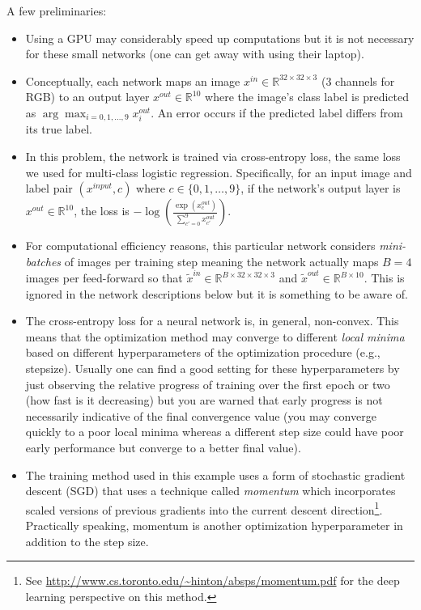 \documentclass{article}
\newcommand{\field}[1]{\mathbb{#1}}
\newcommand{\1}{\mathbf{1}}
\newcommand{\R}{\field{R}} %
\begin{document}
A few preliminaries:
\begin{itemize}
  \item Using a GPU may considerably speed up computations but it is not necessary for these small networks (one can get away with using their laptop).
  \item Conceptually, each network maps an image $x^{in} \in \R^{32 \times 32 \times 3}$ (3 channels for RGB) to an output layer $x^{out} \in \R^{10}$ where the image's class label is predicted as $\arg\max_{i=0,1,\dots,9} x_{i}^{out}$. An error occurs if the predicted label differs from its true label. 
  \item In this problem, the network is trained via cross-entropy loss, the same loss we used for multi-class logistic regression. Specifically, for an input image and label pair $(x^{input}, c)$ where $c \in \{0,1,\dots,9\}$, if the network's output layer is $x^{out} \in \R^{10}$, the loss is $-\log( \frac{\exp(x_c^{out})}{\sum_{c'=0}^9 x_{c'}^{out}})$.
  \item For computational efficiency reasons, this particular network considers \emph{mini-batches} of images per training step meaning the network actually maps $B=4$ images per feed-forward so that $\widetilde{x}^{in} \in \R^{B \times 32 \times 32 \times 3}$  and $\widetilde{x}^{out} \in \R^{B \times 10}$.
  This is ignored in the network descriptions below but it is something to be aware of. 
  \item The cross-entropy loss for a neural network is, in general, non-convex. 
  This means that the optimization method may converge to different \emph{local minima} based on different hyperparameters of the optimization procedure (e.g., stepsize). 
  Usually one can find a good setting for these hyperparameters by just observing the relative progress of training over the first epoch or two (how fast is it decreasing) but you are warned that early progress is not necessarily indicative of the final convergence value (you may converge quickly to a poor local minima whereas a different step size could have poor early performance but converge to a better final value). 
  \item The training method used in this example uses a form of stochastic gradient descent (SGD) that uses a technique called \emph{momentum} which incorporates scaled versions of previous gradients into the current descent direction\footnote{See \url{http://www.cs.toronto.edu/~hinton/absps/momentum.pdf} for the deep learning perspective on this method.}. Practically speaking, momentum is another optimization hyperparameter in addition to the step size. 

\end{itemize}
\end{document}
